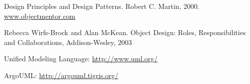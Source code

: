 \documentclass[a4paper,10pt]{article}
\begin{document}



\begin{thebibliography}{9}  
  Design Principles and Design Patterns. Robert C. Martin, 2000.\\
  \url{www.objectmentor.com}
  
  Rebecca Wirfs-Brock and Alan McKean. Object Design: Roles, Responsibilities
and Collaborations, Addison-Wesley, 2003

  Unified Modeling Language: \url{http://www.uml.org/}

  ArgoUML: \url{http://argouml.tigris.org/}

  
\end{thebibliography}
\end{document}

